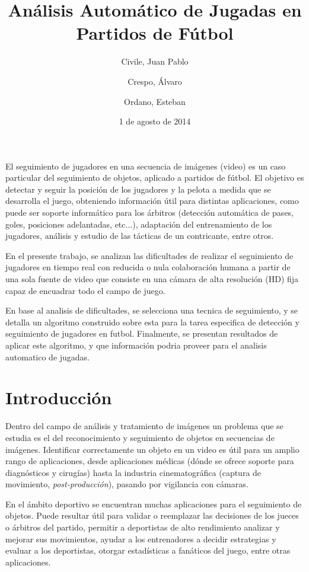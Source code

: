\documentclass[a4paper,11pt]{report}
\title{Análisis Automático de Jugadas en Partidos de Fútbol}
\date{1 de agosto de 2014}
\author{Civile, Juan Pablo \and Crespo, Álvaro \and Ordano, Esteban }
\begin{document}
\pagestyle{fancy}
\maketitle
\thispagestyle{fancy}

\begin{customabstract}
\begin{doublespace}
El seguimiento de jugadores en una secuencia de imágenes (video) es un caso
particular del seguimiento de objetos, aplicado a partidos de fútbol. El
objetivo es detectar y seguir la posición de los jugadores y la pelota a medida
que se desarrolla el juego, obteniendo información útil para distintas
aplicaciones, como puede ser soporte informático para los árbitros (detección
automática de pases, goles, posiciones adelantadas, etc...), adaptación del
entrenamiento de los jugadores, análisis y estudio de las tácticas de un
contricante, entre otros.

En el presente trabajo, se analizan las dificultades de realizar el seguimiento
de jugadores en tiempo real con reducida o nula colaboración humana a partir de
una sola fuente de video que consiste en una cámara de alta resolución (HD)
fija capaz de encuadrar todo el campo de juego. 

En base al analisis de dificultades, se selecciona una tecnica de seguimiento,
y se detalla un algoritmo construido sobre esta para la tarea especifica de 
detección y seguimiento de jugadores en futbol. Finalmente, se presentan 
resultados de aplicar este algoritmo, y que información podria proveer para el
analisis automatico de jugadas.
\end{doublespace}
\end{customabstract}

\tableofcontents

\chapter{Introducción}

Dentro del campo de análisis y tratamiento de imágenes un problema que se
estudia es el del reconocimiento y seguimiento de objetos en secuencias de
imágenes. Identificar correctamente un objeto en un video es útil para un
amplio rango de aplicaciones, desde aplicaciones médicas (dónde se ofrece
soporte para diagnósticos y cirugías) hasta la industria cinematográfica
(captura de movimiento, \textit{post-producción}), pasando por vigilancia con
cámaras. 

En el ámbito deportivo se encuentran muchas aplicaciones para el seguimiento de
objetos. Puede resultar útil para validar o reemplazar las decisiones de los
jueces o árbitros del partido, permitir a deportistas de alto rendimiento
analizar y mejorar sus movimientos, ayudar a los entrenadores a decidir
estrategias y evaluar a los deportistas, otorgar estadísticas a fanáticos del
juego, entre otras aplicaciones.
\end{document}

